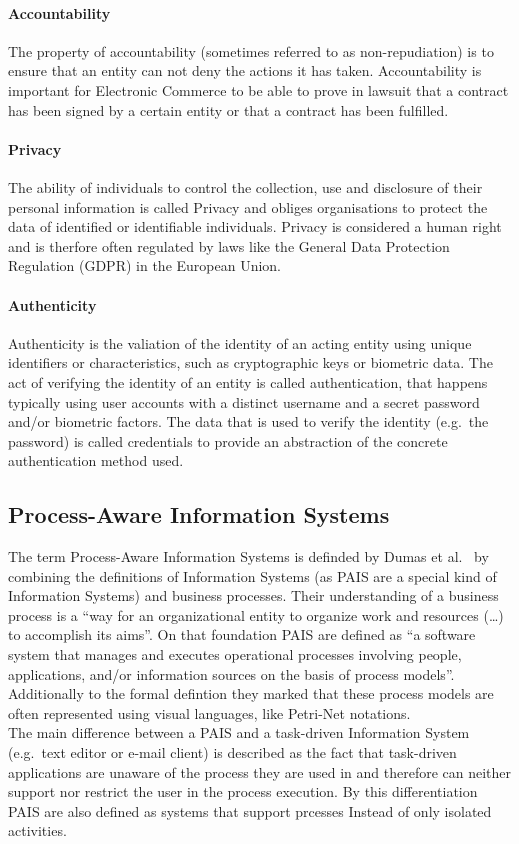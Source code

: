 \documentclass[runningheads]{llncs}
\begin{document}
\paragraph{Accountability} The property of accountability (sometimes referred to as non-repudiation) is to ensure that an entity can not deny the actions it has taken. Accountability is
important for Electronic Commerce to be able to prove in lawsuit that a contract has been signed by a certain entity or that a contract has been fulfilled.
\paragraph{Privacy} The ability of individuals to control the collection, use and disclosure of their personal information is called Privacy and obliges organisations to protect the data of
identified or identifiable individuals. Privacy is considered a human right~\cite{EU} and is therfore often regulated by laws like the General Data Protection Regulation (GDPR) in the European Union.
\paragraph{Authenticity} Authenticity is the valiation of the identity of an acting entity using unique identifiers or characteristics, such as cryptographic keys or biometric data.
The act of verifying the identity of an entity is called authentication, that happens typically using user accounts with a distinct username and a secret password and/or biometric factors.
The data that is used to verify the identity (e.g.\ the password) is called credentials to provide an abstraction of the concrete authentication method used.
\subsection{Process-Aware Information Systems}\label{PAIS}
The term Process-Aware Information Systems is definded by Dumas et al.~\cite{Dumas20051} by combining the definitions of Information Systems (as PAIS are a special kind of Information Systems)
and business processes. Their understanding of a business process is a ``way for an organizational entity to organize work and resources (\ldots) to accomplish its aims''. On that foundation
PAIS are defined as ``a software system that manages and executes operational processes involving people, applications, and/or information sources on the basis of process models''.
Additionally to the formal defintion they marked that these process models are often represented using visual languages, like Petri-Net notations.\\
The main difference between a PAIS and a task-driven Information System (e.g.\ text editor or e-mail client) is described as the fact that task-driven applications are unaware of the process
they are used in and therefore can neither support nor restrict the user in the process execution. By this differentiation PAIS are also defined as systems that support prcesses Instead of only isolated activities.\cite{vanderAalst2016}
\end{document}
